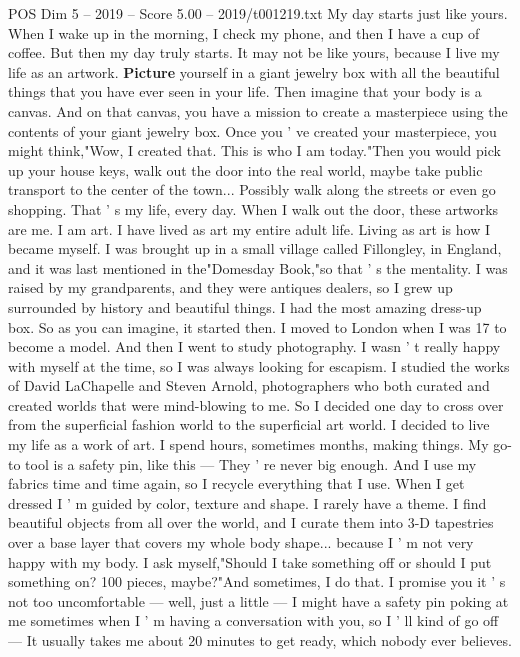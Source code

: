 \begin{textsample}{POS Dim 5 – 2019 – Score 5.00 – 2019/t001219.txt}  \label{ex:f5_pos_077}
My day starts just like yours.
When I wake up in the morning, I check my phone, and then I have a cup of coffee.
But then my day truly starts.
It may not be like yours, because I live my life as an artwork. \textbf{Picture} yourself in a giant jewelry box with all the beautiful things that you have ever seen in your life.
Then imagine that your body is a canvas.
And on that canvas, you have a mission to create a masterpiece using the contents of your giant jewelry box.
Once you ' ve created your masterpiece, you might think,"Wow, I created that.
This is who I am today."Then you would pick up your house keys, walk out the door into the real world, maybe take public transport to the center of the town...
Possibly walk along the streets or even go shopping.
That ' s my life, every day.
When I walk out the door, these artworks are me.
I am art.
I have lived as art my entire adult life.
Living as art is how I became myself.
I was brought up in a small village called Fillongley, in England, and it was last mentioned in the"Domesday Book,"so that ' s the mentality.
I was raised by my grandparents, and they were antiques dealers, so I grew up surrounded by history and beautiful things.
I had the most amazing dress-up box.
So as you can imagine, it started then.
I moved to London when I was 17 to become a model.
And then I went to study photography.
I wasn ' t really happy with myself at the time, so I was always looking for escapism.
I studied the works of David LaChapelle and Steven Arnold, photographers who both curated and created worlds that were mind-blowing to me.
So I decided one day to cross over from the superficial fashion world to the superficial art world.
I decided to live my life as a work of art.
I spend hours, sometimes months, making things.
My go-to tool is a safety pin, like this — They ' re never big enough.
And I use my fabrics time and time again, so I recycle everything that I use.
When I get dressed I ' m guided by color, texture and shape.
I rarely have a theme.
I find beautiful objects from all over the world, and I curate them into 3-D tapestries over a base layer that covers my whole body shape... because I ' m not very happy with my body.
I ask myself,"Should I take something off or should I put something on? 100 pieces, maybe?"And sometimes, I do that.
I promise you it ' s not too uncomfortable — well, just a little — I might have a safety pin poking at me sometimes when I ' m having a conversation with you, so I ' ll kind of go off — It usually takes me about 20 minutes to get ready, which nobody ever believes.

\end{textsample}

